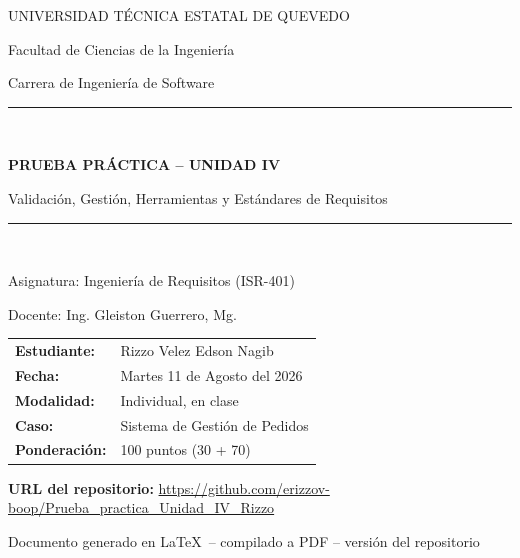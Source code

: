 \documentclass[11pt,a4paper]{article}
\begin{document}
\begin{titlepage}
\centering
\vspace*{1cm}

{\large UNIVERSIDAD TÉCNICA ESTATAL DE QUEVEDO\par}
{\normalsize Facultad de Ciencias de la Ingeniería \par}
{\normalsize Carrera de Ingeniería de Software \par}

\vspace{1.2cm}
\rule{0.9\textwidth}{0.4pt}\\[0.4cm]
{\LARGE \bfseries PRUEBA PRÁCTICA -- UNIDAD IV \par}
\vspace{0.3cm}
{\Large Validación, Gestión, Herramientas y Estándares de Requisitos \par}
\rule{0.9\textwidth}{0.4pt}\\[1cm]

{\normalsize Asignatura: Ingeniería de Requisitos (ISR-401) \par}
{\normalsize Docente: Ing. Gleiston Guerrero, Mg. \par}
\vspace{0.6cm}


\begin{tabular}{ll}
\textbf{Estudiante:} & Rizzo Velez Edson Nagib \\[0.4cm]
\textbf{Fecha:} & Martes 11 de Agosto del 2026 \\[0.4cm]
\textbf{Modalidad:} & Individual, en clase \\[0.4cm]
\textbf{Caso:} & Sistema de Gestión de Pedidos \\[0.4cm]
\textbf{Ponderación:} & 100 puntos (30 + 70) \\
\end{tabular}

\vspace{0.8cm}

{\large \textbf{URL del repositorio:} \url{https://github.com/erizzov-boop/Prueba_practica_Unidad_IV_Rizzo}}

\vspace{0.8cm}


\vspace{0.5cm}

\vfill
{\small Documento generado en \LaTeX\ -- compilado a PDF -- versión del repositorio}
\end{titlepage}
\end{document}
